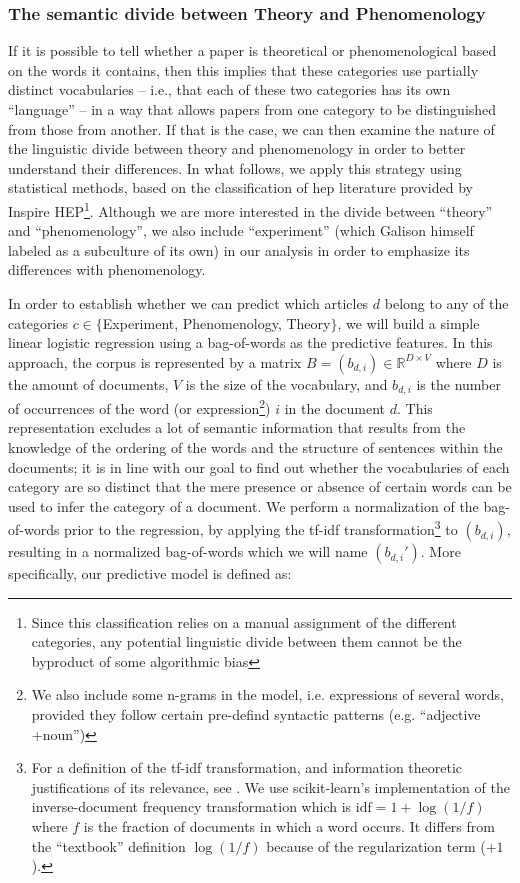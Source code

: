 \documentclass[smallextended]{svjour3}
\begin{document}
\subsubsection{The semantic divide between Theory and Phenomenology}

If it is possible to tell whether a paper is theoretical or phenomenological based on the words it contains, then this implies that these categories use partially distinct vocabularies -- i.e., that each of these two categories has its own ``language'' -- in a way that allows papers from one category to be distinguished from those from another. If that is the case, we can then examine the nature of the linguistic divide between theory and phenomenology in order to better understand their differences. In what follows, we apply this strategy using statistical methods, based on the classification of \gls{hep} literature provided by Inspire HEP\footnote{Since this classification relies on a manual assignment of the different categories, any potential linguistic divide between them cannot be the byproduct of some algorithmic bias}. Although we are more interested in the divide between ``theory'' and ``phenomenology'', we also include ``experiment'' (which Galison himself labeled as a subculture of its own) in our analysis in order to emphasize its differences with phenomenology.

In order to establish whether we can predict which articles $d$ belong to any of the categories $c \in \{$Experiment, Phenomenology, Theory$\}$, we will build a simple linear logistic regression using a bag-of-words as the predictive features. In this approach, the corpus is represented by a matrix $B=(b_{d,i}) \in \mathbb{R}^{D\times V}$ where $D$ is the amount of documents, $V$ is the size of the vocabulary, and $b_{d,i}$ is the number of occurrences of the word (or expression\footnote{We also include some n-grams in the model, i.e. expressions of several words, provided they follow certain pre-defind syntactic patterns (e.g. ``adjective +noun'')}) $i$ in the document $d$. This representation excludes a lot of semantic information that results from the knowledge of the ordering of the words and the structure of sentences within the documents; it is in line with our goal to find out whether the vocabularies of each category are so distinct that the mere presence or absence of certain words can be used to infer the category of a document. We perform a normalization of the bag-of-words prior to the regression, by applying the tf-idf transformation\footnote{For a definition of the tf-idf transformation, and information theoretic justifications of its relevance, see \citealt{Beel2015_tfidf_uses,Robertson2004_tfidf_justification}. We use scikit-learn's implementation of the inverse-document frequency transformation which is $\text{idf} = 1+\log(1/f)$ where $f$ is the fraction of documents in which a word occurs. It differs from the ``textbook'' definition $\log(1/f)$ because of the regularization term ($+1$).} to $(b_{d,i})$, resulting in a normalized bag-of-words which we will name $(b_{d,i}')$. More specifically, our predictive model is defined as: 
\end{document}
